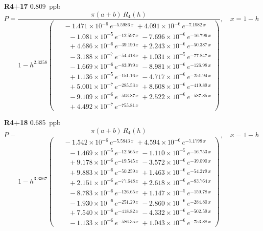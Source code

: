 \documentclass[12pt]{article}
\begin{document}
\noindent\textbf{R4+17} 0.809~ppb\nopagebreak
\begin{equation*}
P = \frac{\pi(a{+}b)\,R_4(h)}{1 - h^{2.3358}\!\left(\!\begin{aligned}
  &\; -1.471{\times}10^{-6}\,e^{-5.5986\,x} \; +4.091{\times}10^{-6}\,e^{-7.1982\,x} \\[-3pt]
  &\quad -1.081{\times}10^{-5}\,e^{-12.597\,x} \; -7.696{\times}10^{-6}\,e^{-16.796\,x} \\[-3pt]
  &\quad +4.686{\times}10^{-6}\,e^{-39.190\,x} \; +2.243{\times}10^{-6}\,e^{-50.387\,x} \\[-3pt]
  &\quad -3.188{\times}10^{-7}\,e^{-54.418\,x} \; +1.031{\times}10^{-5}\,e^{-77.847\,x} \\[-3pt]
  &\quad -1.669{\times}10^{-6}\,e^{-83.979\,x} \; -8.981{\times}10^{-6}\,e^{-126.98\,x} \\[-3pt]
  &\quad +1.136{\times}10^{-5}\,e^{-151.16\,x} \; -4.717{\times}10^{-6}\,e^{-251.94\,x} \\[-3pt]
  &\quad +5.001{\times}10^{-7}\,e^{-285.53\,x} \; +8.608{\times}10^{-6}\,e^{-419.89\,x} \\[-3pt]
  &\quad -9.109{\times}10^{-6}\,e^{-503.87\,x} \; +2.522{\times}10^{-6}\,e^{-587.85\,x} \\[-3pt]
  &\quad +4.492{\times}10^{-7}\,e^{-755.81\,x}
\end{aligned}\!\right)}, \quad x = 1{-}h
\end{equation*}

\noindent\textbf{R4+18} 0.685~ppb\nopagebreak
\begin{equation*}
P = \frac{\pi(a{+}b)\,R_4(h)}{1 - h^{3.3367}\!\left(\!\begin{aligned}
  &\; -1.542{\times}10^{-6}\,e^{-5.5843\,x} \; +4.594{\times}10^{-6}\,e^{-7.1798\,x} \\[-3pt]
  &\quad -1.469{\times}10^{-5}\,e^{-12.565\,x} \; -1.110{\times}10^{-5}\,e^{-16.753\,x} \\[-3pt]
  &\quad +9.178{\times}10^{-6}\,e^{-19.545\,x} \; -3.572{\times}10^{-6}\,e^{-39.090\,x} \\[-3pt]
  &\quad +9.883{\times}10^{-6}\,e^{-50.259\,x} \; +1.463{\times}10^{-6}\,e^{-54.279\,x} \\[-3pt]
  &\quad +2.151{\times}10^{-6}\,e^{-77.648\,x} \; +2.618{\times}10^{-6}\,e^{-83.764\,x} \\[-3pt]
  &\quad -8.783{\times}10^{-6}\,e^{-126.65\,x} \; +1.147{\times}10^{-5}\,e^{-150.78\,x} \\[-3pt]
  &\quad -1.930{\times}10^{-6}\,e^{-251.29\,x} \; -2.860{\times}10^{-6}\,e^{-284.80\,x} \\[-3pt]
  &\quad +7.540{\times}10^{-6}\,e^{-418.82\,x} \; -4.332{\times}10^{-6}\,e^{-502.59\,x} \\[-3pt]
  &\quad -1.133{\times}10^{-6}\,e^{-586.35\,x} \; +1.043{\times}10^{-6}\,e^{-753.88\,x}
\end{aligned}\!\right)}, \quad x = 1{-}h
\end{equation*}
\end{document}
